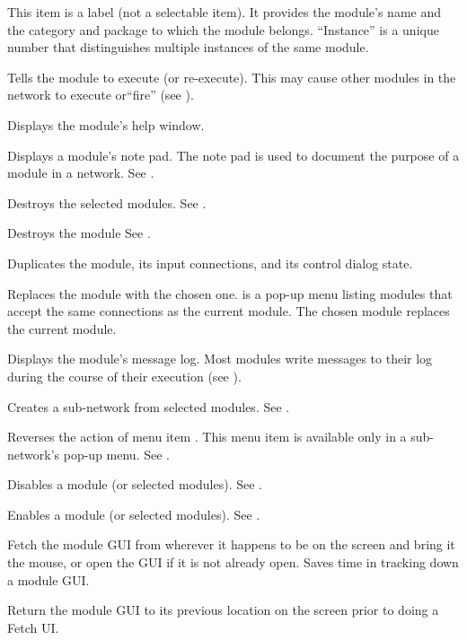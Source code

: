 \begin{description}
  \begin{description}
     This item is a
    label (not a selectable item).  It provides the module's name and
    the category and package to which the module belongs.
    ``Instance'' is a unique number that distinguishes multiple
    instances of the same module.
    
     Tells the module to execute (or
    re-execute).  This may cause other modules in the network to
    execute or``fire'' (see ).

     Displays the module's help window.
    
     Displays a module's note pad.  The note pad
    is used to document the purpose of a module in a network.  See
    .

     Destroys the selected modules.
    See .
    
     Destroys the module See .

     Duplicates the module, its input connections,
    and its control dialog state.
    
     Replaces the module with the chosen
    one.   is a pop-up menu listing modules that
    accept the same connections as the current module.  The chosen
    module replaces the current module.
    
     Displays the module's message log.  Most
    modules write messages to their log during the course of
    their execution (see ).
    
     Creates a sub-network from
    selected modules.  See .
    
     Reverses the action of menu item
    .  This menu item is available only in
    a sub-network's pop-up menu.  See .
    
     Disables a module (or selected modules).
    See .
    
     Enables a module (or selected modules).  See
    .

     Fetch the module GUI from wherever it happens
    to be on the screen and bring it the mouse, or open the GUI if it is
    not already open. Saves time in tracking down a module GUI.

     Return the module GUI to its previous location
    on the screen prior to doing a Fetch UI.

  \end{description}
\end{description}


